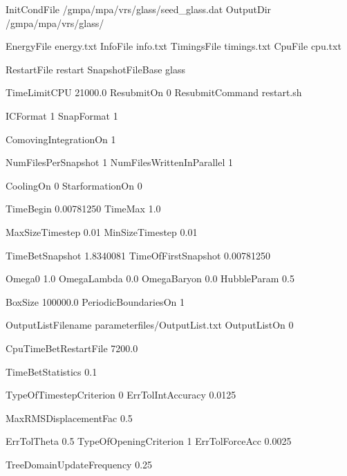 
InitCondFile    /gmpa/mpa/vrs/glass/seed_glass.dat
OutputDir       /gmpa/mpa/vrs/glass/

EnergyFile        energy.txt
InfoFile          info.txt
TimingsFile       timings.txt
CpuFile           cpu.txt

RestartFile       restart
SnapshotFileBase  glass



TimeLimitCPU      21000.0  %
ResubmitOn        0
ResubmitCommand   restart.sh



ICFormat              1
SnapFormat            1 

ComovingIntegrationOn 1

NumFilesPerSnapshot       1
NumFilesWrittenInParallel 1

CoolingOn 0
StarformationOn 0


TimeBegin           0.00781250
TimeMax	            1.0

MaxSizeTimestep        0.01
MinSizeTimestep        0.01

TimeBetSnapshot        1.8340081
TimeOfFirstSnapshot    0.00781250


Omega0	              1.0
OmegaLambda           0.0
OmegaBaryon           0.0
HubbleParam           0.5

BoxSize                100000.0
PeriodicBoundariesOn   1



OutputListFilename  parameterfiles/OutputList.txt
OutputListOn        0


 
CpuTimeBetRestartFile  7200.0

TimeBetStatistics      0.1



TypeOfTimestepCriterion 0
ErrTolIntAccuracy       0.0125 

MaxRMSDisplacementFac   0.5    




ErrTolTheta            0.5
TypeOfOpeningCriterion 1
ErrTolForceAcc         0.0025



TreeDomainUpdateFrequency    0.25



